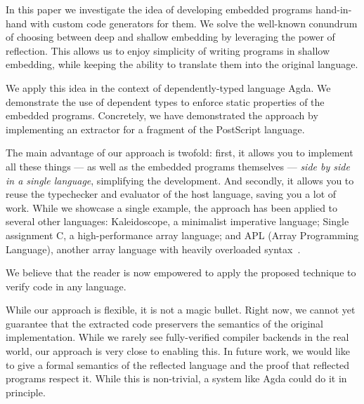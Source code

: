 \documentclass[sigplan,screen]{acmart}
\renewcommand\paragraph{\noindentparagraph}
\begin{document}
In this paper we investigate the idea of developing
embedded programs hand-in-hand with custom
code generators for them. We solve the well-known
conundrum of choosing between deep and shallow
embedding by leveraging the power of
reflection.
This allows us to enjoy simplicity of writing programs
in shallow embedding, while keeping the ability to translate
them into the original language.

We apply this idea in the context of dependently-typed
language Agda.  We demonstrate the use of dependent types
to enforce static properties of the embedded programs.
Concretely, we have demonstrated the approach by implementing
an extractor for a fragment of the PostScript language.

The main advantage of our approach is twofold: first, it allows
you to implement all these things --- as well as the embedded programs
themselves --- \emph{side by side in a single language}, simplifying
the development. And secondly, it allows you to reuse the typechecker
and evaluator of the host language, saving you a lot of work.
While we showcase a single example, the approach has been applied
to several other languages: Kaleidoscope, a minimalist imperative language;
Single assignment C, a high-performance array language; and
APL (Array Programming Language), another array language with
heavily overloaded syntax~\cite{DBLP:journals/corr/abs-2105-10819}.


We believe that the reader is now empowered to apply the proposed
technique to verify code in any language.


\paragraph{Future work} While our approach is flexible, it is not a
magic bullet. Right now, we cannot yet guarantee that the extracted
code preservers the semantics of the original implementation. While we
rarely see fully-verified compiler backends in the real world, our
approach is very close to enabling this.  In future work, we would
like to give a formal semantics of the reflected language and the
proof that reflected programs respect it.  While this is non-trivial,
a system like Agda could do it in principle.

\end{document}
